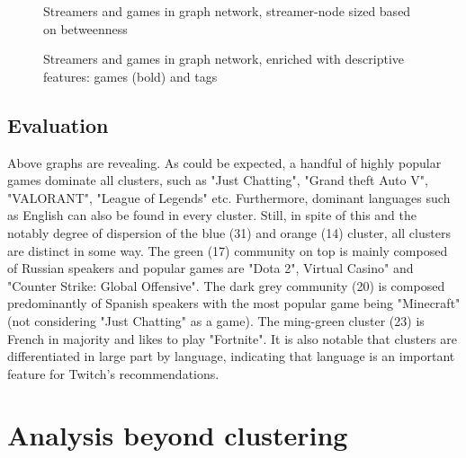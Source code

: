 \documentclass[11pt, oneside]{article}   	%
\begin{document}
\begin{figure}
\centering
\caption{Streamers and games in graph network, streamer-node sized based on betweenness}
\label{figure label}
\end{figure}

\begin{figure}
\centering
\caption{Streamers and games in graph network, enriched with descriptive features: games (bold) and tags}
\label{figure label}
\end{figure}
\subsection{Evaluation}
Above graphs are revealing. As could be expected, a handful of highly popular games dominate all clusters, such as "Just Chatting", "Grand theft Auto V", "VALORANT", "League of Legends" etc. Furthermore, dominant languages such as English can also be found in every cluster.
Still, in spite of this and the notably degree of dispersion of the blue (31) and orange (14) cluster, all clusters are distinct in some way. 
\newline
The green (17) community on top is mainly composed of Russian speakers and popular games are "Dota 2", Virtual Casino" and "Counter Strike: Global Offensive". The dark grey community (20) is composed predominantly of Spanish speakers with the most popular game being "Minecraft" (not considering "Just Chatting" as a game). The ming-green cluster (23) is French in majority and likes to play "Fortnite".
\newline
It is also notable that clusters are differentiated in large part by language, indicating that language is an important feature for Twitch's recommendations. 

\newpage
\section{Analysis beyond clustering}
\end{document}
